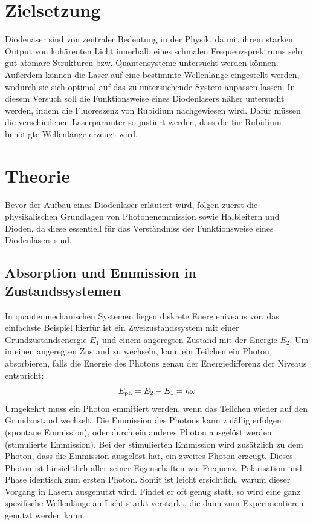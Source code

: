\section{Zielsetzung}
\label{sec:Zielsetzung}
Diodenaser sind von zentraler Bedeutung in der Physik, da mit ihrem starken Output von kohärenten
Licht innerhalb eines schmalen Frequenzsprektrums sehr gut atomare Strukturen bzw. Quantensysteme
untersucht werden können. Außerdem können die Laser auf eine bestimmte Wellenlänge eingestellt werden, 
wodurch sie sich optimal auf das zu untersuchende System anpassen lassen.
In diesem Versuch soll die Funktionsweise eines Diodenlasers näher untersucht werden, indem die
Fluoreszenz von Rubidium nachgewiesen wird. Dafür müssen die verschiedenen Laserparamter so justiert werden,
dass die für Rubidium benötigte Wellenlänge erzeugt wird.

\section{Theorie}
\label{sec:Theorie}

Bevor der Aufbau eines Diodenlaser erläutert wird, folgen zuerst die physikalischen Grundlagen von Photonenemmission
sowie Halbleitern und Dioden, da diese essentiell für das Verständniss der Funktionsweise eines Diodenlasers sind.

\subsection{Absorption und Emmission in Zustandssystemen}
\label{sec:sub1}

In quantenmechanischen Systemen liegen diskrete Energieniveaus vor, das einfachste Beispiel hierfür ist ein Zweizustandssystem
mit einer Grundzustandsenergie $E_1$ und einem angeregten Zustand mit der Energie $E_2$. Um in einen
angeregten Zustand zu wechseln, kann ein Teilchen ein Photon absorbieren, falls die Energie des Photons genau der
Energiedifferenz der Niveaus entspricht:
\begin{equation}
    \notag
    E_{\text{ph}} = E_2 - E_1 = h \omega
\end{equation}
Umgekehrt muss ein Photon emmitiert werden, wenn das Teilchen wieder auf den Grundzustand wechselt.
Die Emmission des Photons kann zufällig erfolgen (spontane Emmission), oder durch ein anderes Photon
ausgelöst werden (stimulierte Emmission). Bei der stimulierten Emmission wird zusätzlich zu dem Photon,
dass die Emmission ausgelöst hat, ein zweites Photon erzeugt. Dieses Photon ist hinsichtlich aller seiner
Eigenschaften wie Frequenz, Polarisation und Phase identisch zum ersten Photon. Somit ist leicht
ersichtlich, warum dieser Vorgang in Lasern ausgenutzt wird. Findet er oft genug statt, so wird eine
ganz spezifische Wellenlänge an Licht starkt verstärkt, die dann zum Experimentieren genutzt werden kann.


